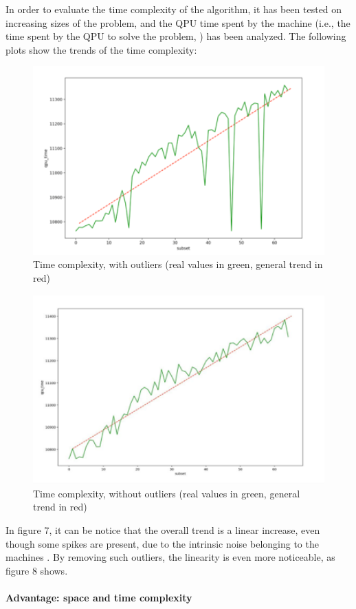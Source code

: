\documentclass[oneside,a4paper]{article}
\begin{document}
In order to evaluate the time complexity of the algorithm, it has been tested on increasing sizes of the problem, and the QPU time spent by the machine (i.e., the time spent by the QPU to solve the problem, \cite{WebSite13}) has been analyzed. The following plots show the trends of the time complexity:
\begin{figure}[htp]
\centering
\includegraphics[width=15cm]{LaTeXTemplate/Images/2000QfirstT1.png}
\caption{Time complexity, with outliers (real values in green, general trend in red)}
\end{figure}
\begin{figure}[htp]
\centering
\includegraphics[width=15cm]{LaTeXTemplate/Images/2000QfirstT2.png}
\caption{Time complexity, without outliers (real values in green, general trend in red)}
\end{figure}

In figure 7, it can be notice that the overall trend is a linear increase, even though some spikes are present, due to the intrinsic noise belonging to the machines \cite{WebSite14}. By removing such outliers, the linearity is even more noticeable, as figure 8 shows.
\\
\\
\textbf{Advantage: space and time complexity} \\
\end{document}
